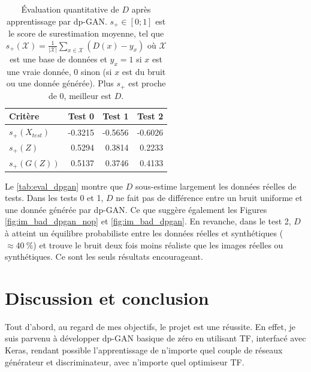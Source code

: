 \documentclass[a4paper,11pt,twoside]{article}
\theoremstyle{definition}
\begin{document}
\begin{table}
    \caption{Évaluation quantitative de $D$ après apprentissage par dp-GAN. $s_+ \in [0; 1]$ est le score de surestimation moyenne, tel que $s_+(\mathcal{X})= \frac{1}{\lvert \mathcal{X} \rvert} \sum_{x \in \mathcal{X}} (D(x)-y_x)$ où $\mathcal{X}$ est une base de données et $y_x = 1$ si $x$ est une vraie donnée, 0 sinon (si $x$ est du bruit ou une donnée générée). Plus $s_+$ est proche de 0, meilleur est $D$.}
    \label{tab:eval_dpgan}
    \begin{tabular}{@{}lrrr@{}}
        \toprule
        \textbf{Critère} & \textbf{Test 0} & \textbf{Test 1} & \textbf{Test 2} \\ \midrule
        $s_+(X_\mathit{test})$ & -0.3215 & -0.5656 & -0.6026 \\
        $s_+(Z)$ & 0.5294 & 0.3814 & 0.2233 \\
        $s_+(G(Z))$ & 0.5137 & 0.3746 & 0.4133 \\
        \bottomrule
    \end{tabular}
\end{table}

Le \autoref{tab:eval_dpgan} montre que $D$ sous-estime largement les données réelles de tests. Dans les tests 0 et 1, $D$ ne fait pas de différence entre un bruit uniforme et une donnée générée par dp-GAN. Ce que suggère également les Figures \ref{fig:im_bad_dpgan_nop} et \ref{fig:im_bad_dpgan}. En revanche, dans le test 2, $D$ à atteint un équilibre probabiliste entre les données réelles et synthétiques ($\approx 40~\%$) et trouve le bruit deux fois moins réaliste que les images réelles ou synthétiques. Ce sont les seuls résultats encourageant.


\section{Discussion et conclusion}
\label{conc}

Tout d'abord, au regard de mes objectifs, le projet est une réussite. En effet, je suis parvenu à développer dp-GAN basique de zéro en utilisant TF, interfacé avec Keras, rendant possible l'apprentissage de n'importe quel couple de réseaux générateur et discriminateur, avec n'importe quel optimiseur TF.
\end{document}
